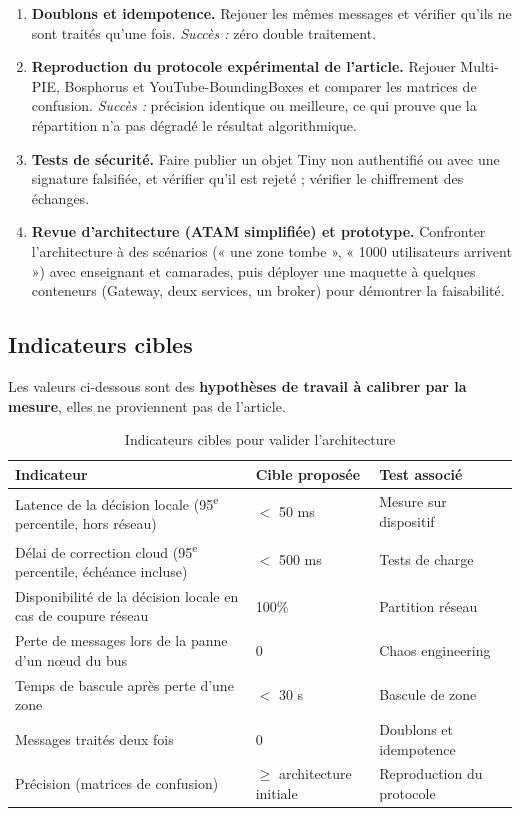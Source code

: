 \documentclass[11pt,a4paper]{article}
\begin{document}
\begin{enumerate}
    \item \textbf{Doublons et idempotence.} Rejouer les mêmes messages et vérifier qu'ils ne sont traités qu'une fois. \textit{Succès :} zéro double traitement.

    \item \textbf{Reproduction du protocole expérimental de l'article.} Rejouer Multi-PIE, Bosphorus et YouTube-BoundingBoxes et comparer les matrices de confusion. \textit{Succès :} précision identique ou meilleure, ce qui prouve que la répartition n'a pas dégradé le résultat algorithmique.

    \item \textbf{Tests de sécurité.} Faire publier un objet Tiny non authentifié ou avec une signature falsifiée, et vérifier qu'il est rejeté ; vérifier le chiffrement des échanges.

    \item \textbf{Revue d'architecture (ATAM simplifiée) et prototype.} Confronter l'architecture à des scénarios (« une zone tombe », « 1000 utilisateurs arrivent ») avec enseignant et camarades, puis déployer une maquette à quelques conteneurs (Gateway, deux services, un broker) pour démontrer la faisabilité.
\end{enumerate}

\subsection{Indicateurs cibles}

Les valeurs ci-dessous sont des \textbf{hypothèses de travail à calibrer par la mesure}, elles ne proviennent pas de l'article.

\begin{table}[h]
\centering
\begin{tabular}{|p{6.6cm}|p{4.0cm}|p{3.8cm}|}
\hline
\textbf{Indicateur} & \textbf{Cible proposée} & \textbf{Test associé} \\
\hline
Latence de la décision locale (95\textsuperscript{e} percentile, hors réseau) & $<$ 50 ms & Mesure sur dispositif \\
\hline
Délai de correction cloud (95\textsuperscript{e} percentile, échéance incluse) & $<$ 500 ms & Tests de charge \\
\hline
Disponibilité de la décision locale en cas de coupure réseau & 100\% & Partition réseau \\
\hline
Perte de messages lors de la panne d'un nœud du bus & 0 & Chaos engineering \\
\hline
Temps de bascule après perte d'une zone & $<$ 30 s & Bascule de zone \\
\hline
Messages traités deux fois & 0 & Doublons et idempotence \\
\hline
Précision (matrices de confusion) & $\geq$ architecture initiale & Reproduction du protocole \\
\hline
\end{tabular}
\caption{Indicateurs cibles pour valider l'architecture}
\end{table}
\end{document}
